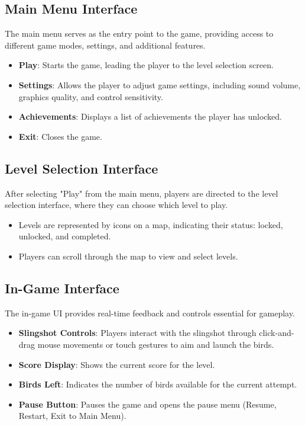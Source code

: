 \documentclass[12pt]{article}
\begin{document}
\subsection{Main Menu Interface}
The main menu serves as the entry point to the game, providing access to different game modes, settings, and additional features.
\begin{itemize}
    \item \textbf{Play}: Starts the game, leading the player to the level selection screen.
    \item \textbf{Settings}: Allows the player to adjust game settings, including sound volume, graphics quality, and control sensitivity.
    \item \textbf{Achievements}: Displays a list of achievements the player has unlocked.
    \item \textbf{Exit}: Closes the game.
\end{itemize}

\subsection{Level Selection Interface}
After selecting "Play" from the main menu, players are directed to the level selection interface, where they can choose which level to play.
\begin{itemize}
    \item Levels are represented by icons on a map, indicating their status: locked, unlocked, and completed.
    \item Players can scroll through the map to view and select levels.
\end{itemize}

\subsection{In-Game Interface}
The in-game UI provides real-time feedback and controls essential for gameplay.
\begin{itemize}
    \item \textbf{Slingshot Controls}: Players interact with the slingshot through click-and-drag mouse movements or touch gestures to aim and launch the birds.
    \item \textbf{Score Display}: Shows the current score for the level.
    \item \textbf{Birds Left}: Indicates the number of birds available for the current attempt.
    \item \textbf{Pause Button}: Pauses the game and opens the pause menu (Resume, Restart, Exit to Main Menu).
\end{itemize}
\end{document}
